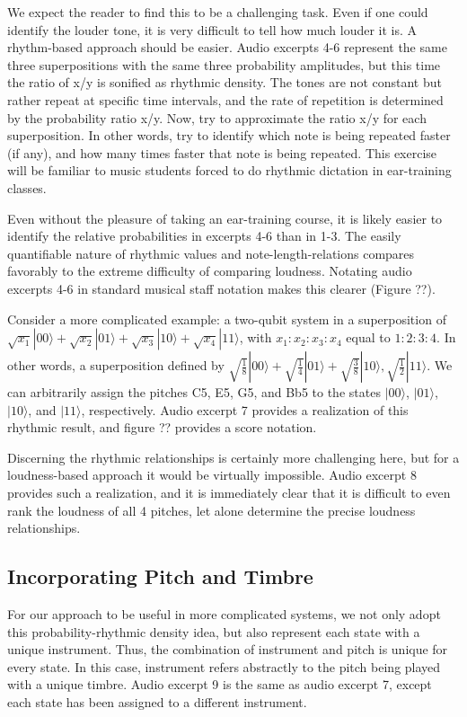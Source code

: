 \documentclass[10pt,twocolumn]{article}
\begin{document}
We expect the reader to find this to be a challenging task. Even if one could identify the louder tone, it is very difficult to tell how much louder it is. A rhythm-based approach should be easier. Audio excerpts 4-6 represent the same three superpositions with the same three probability amplitudes, but this time the ratio of x/y is sonified as rhythmic density. The tones are not constant but rather repeat at specific time intervals, and the rate of repetition is determined by the probability ratio x/y. Now, try to approximate the ratio x/y for each superposition. In other words, try to identify which note is being repeated faster (if any), and how many times faster that note is being repeated. This exercise will be familiar to music students forced to do rhythmic dictation in ear-training classes.

Even without the pleasure of taking an ear-training course, it is likely easier to identify the relative probabilities in excerpts 4-6 than in 1-3. The easily quantifiable nature of rhythmic values and note-length-relations compares favorably to the extreme difficulty of comparing loudness. Notating audio excerpts 4-6 in standard musical staff notation makes this clearer (Figure ??).

Consider a more complicated example: a two-qubit system in a superposition of $\sqrt{x_1}|00\rangle + \sqrt{x_2}|01\rangle + \sqrt{x_3}|10\rangle + \sqrt{x_4}|11\rangle$, with $x_1:x_2:x_3:x_4$ equal to $1:2:3:4$. In other words, a superposition defined by $\sqrt{\frac{1}{8}}|00\rangle + \sqrt{\frac{1}{4}}|01\rangle + \sqrt{\frac{3}{8}}|10\rangle, \sqrt{\frac{1}{2}}|11\rangle$. We can arbitrarily assign the pitches C5, E5, G5, and Bb5 to the states $|00\rangle$, $|01\rangle$, $|10\rangle$, and $|11\rangle$, respectively. Audio excerpt 7 provides a realization of this rhythmic result, and figure ?? provides a score notation.  

Discerning the rhythmic relationships is certainly more challenging here, but for a loudness-based approach it would be virtually impossible. Audio excerpt 8 provides such a realization, and it is immediately clear that it is difficult to even rank the loudness of all 4 pitches, let alone determine the precise loudness relationships.

\subsection{Incorporating Pitch and Timbre}

For our approach to be useful in more complicated systems, we not only adopt this probability-rhythmic density idea, but also represent each state with a unique instrument. Thus, the combination of instrument and pitch is unique for every state. In this case, instrument refers abstractly to the pitch being played with a unique timbre. Audio excerpt 9 is the same as audio excerpt 7, except each state has been assigned to a different instrument.
\end{document}
